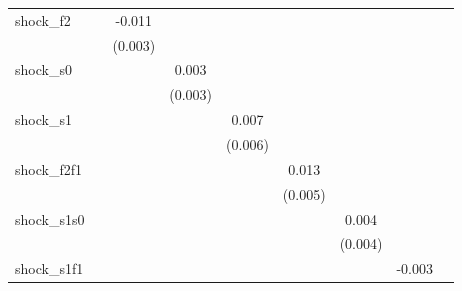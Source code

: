 {\begin{tabular}{l*{8}{c}}
\addlinespace
shock\_f2    &                     &      -0.011\sym{***}&                     &                     &                     &                     &                     &                     \\
            &                     &     (0.003)         &                     &                     &                     &                     &                     &                     \\
\addlinespace
shock\_s0    &                     &                     &       0.003         &                     &                     &                     &                     &                     \\
            &                     &                     &     (0.003)         &                     &                     &                     &                     &                     \\
\addlinespace
shock\_s1    &                     &                     &                     &       0.007         &                     &                     &                     &                     \\
            &                     &                     &                     &     (0.006)         &                     &                     &                     &                     \\
\addlinespace
shock\_f2f1  &                     &                     &                     &                     &       0.013\sym{**} &                     &                     &                     \\
            &                     &                     &                     &                     &     (0.005)         &                     &                     &                     \\
\addlinespace
shock\_s1s0  &                     &                     &                     &                     &                     &       0.004         &                     &                     \\
            &                     &                     &                     &                     &                     &     (0.004)         &                     &                     \\
\addlinespace
shock\_s1f1  &                     &                     &                     &                     &                     &                     &      -0.003         &                     \\

\end{tabular}}
